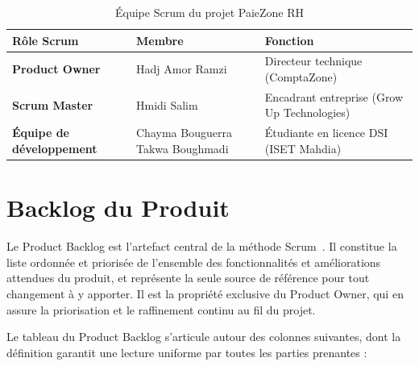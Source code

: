 \begin{table}[htbp]
    \centering
    \renewcommand{\arraystretch}{1.8}
    \begin{tabularx}{\textwidth}{|>{\raggedright\arraybackslash\bfseries}p{4.2cm}|>{\raggedright\arraybackslash}p{4cm}|X|}
        \hline
        \rowcolor[HTML]{EFEFEF}
        Rôle Scrum & Membre & Fonction \\ \hline
        Product Owner  & Hadj Amor Ramzi & Directeur technique  (ComptaZone) \\ \hline
        Scrum Master & Hmidi Salim & Encadrant entreprise \newline (Grow Up Technologies) \\ \hline
        Équipe de développement & Chayma Bouguerra \newline Takwa Boughmadi & Étudiante en licence DSI \newline (ISET Mahdia) \\ \hline
    \end{tabularx}
    \caption{Équipe Scrum du projet PaieZone RH}
    \label{tab:equipe_scrum}
\end{table}
\section{Backlog du Produit}\label{sec:backlog}

Le Product Backlog est l'artefact central de la méthode Scrum~\cite{scrum}. Il constitue la liste ordonnée et priorisée de l'ensemble des fonctionnalités et améliorations attendues du produit, et représente la seule source de référence pour tout changement à y apporter. Il est la propriété exclusive du Product Owner, qui en assure la priorisation et le raffinement continu au fil du projet.

Le tableau du Product Backlog s'articule autour des colonnes suivantes, dont la définition garantit une lecture uniforme par toutes les parties prenantes :


